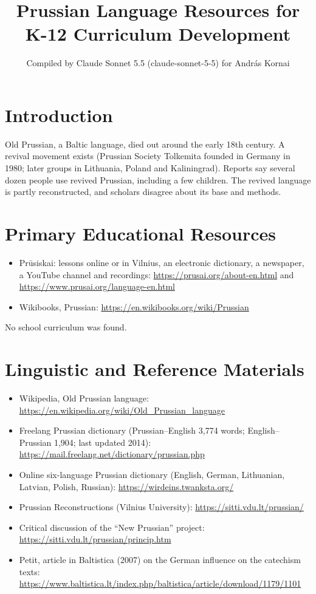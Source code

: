 \documentclass[12pt]{article}
\title{Prussian Language Resources for K-12 Curriculum Development}
\author{Compiled by Claude Sonnet 5.5 (claude-sonnet-5-5) for Andr\'as Kornai}
\date{}
\begin{document}
\maketitle

\section{Introduction}
Old Prussian, a Baltic language, died out around the early 18th century. A revival movement exists (Prussian Society Tolkemita founded in Germany in 1980; later groups in Lithuania, Poland and Kaliningrad). Reports say several dozen people use revived Prussian, including a few children. The revived language is partly reconstructed, and scholars disagree about its base and methods.

\section{Primary Educational Resources}
\begin{itemize}
\item Pr\={u}siskai: lessons online or in Vilnius, an electronic dictionary, a newspaper, a YouTube channel and recordings: \url{https://prusai.org/about-en.html} and \url{https://www.prusai.org/language-en.html}
\item Wikibooks, Prussian: \url{https://en.wikibooks.org/wiki/Prussian}
\end{itemize}
No school curriculum was found.

\section{Linguistic and Reference Materials}
\begin{itemize}
\item Wikipedia, Old Prussian language: \url{https://en.wikipedia.org/wiki/Old_Prussian_language}
\item Freelang Prussian dictionary (Prussian--English 3,774 words; English--Prussian 1,904; last updated 2014): \url{https://mail.freelang.net/dictionary/prussian.php}
\item Online six-language Prussian dictionary (English, German, Lithuanian, Latvian, Polish, Russian): \url{https://wirdeins.twanksta.org/}
\item Prussian Reconstructions (Vilnius University): \url{https://sitti.vdu.lt/prussian/}
\item Critical discussion of the ``New Prussian'' project: \url{https://sitti.vdu.lt/prussian/princip.htm}
\item Petit, article in Baltistica (2007) on the German influence on the catechism texts: \url{https://www.baltistica.lt/index.php/baltistica/article/download/1179/1101}
\end{itemize}
\end{document}
